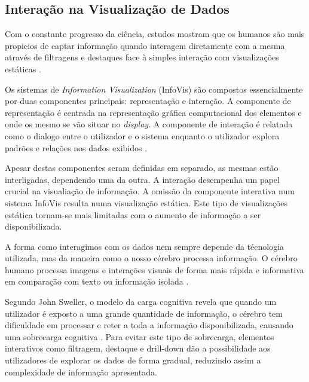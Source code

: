 \subsection{Interação na Visualização de Dados} %
\label{sub:elem_int}

Com o constante progresso da ciência, estudos mostram que os humanos são mais propicios de captar informação quando interagem diretamente com a mesma através de filtragens e destaques face à simples interação com visualizações estáticas \cite{heer2012interactive}. 

Os sistemas de \textit{Information Visualization} (\gls{InfoVis}) são compostos essencialmente por duas componentes principais: representação e interação. A componente de representação é centrada na representação gráfica computacional dos elementos e onde os mesmo se vão situar no \textit{display}. A componente de interação é relatada como o dialogo entre o utilizador e o sistema enquanto o utilizador explora padrões e relações nos dados exibidos \cite{yi2007toward}. 

Apesar destas componentes seram definidas em separado, as mesmas estão interligadas, dependendo uma da outra. A interação desempenha um papel crucial na visualiação de informação. A omissão da componente interativa num sistema \gls{InfoVis} resulta numa visualização estática. Este tipo de visualizações estática tornam-se mais limitadas com o aumento de informação a ser disponibilizada.

A forma como interagimos com os dados nem sempre depende da técnologia utilizada, mas da maneira como o nosso cérebro processa informação. O cérebro humano processa imagens e interações visuais de forma mais rápida e informativa em comparação com texto ou informação isolada \cite{ware2019information}.

Segundo John Sweller, o modelo da carga cognitiva revela que quando um utilizador é exposto a uma grande quantidade de informação, o cérebro tem dificuldade em processar e reter a toda a informação disponibilizada, causando uma sobrecarga cognitiva \cite{sweller1988cognitive}. Para evitar este tipo de sobrecarga, elementos interativos como filtragem, destaque e drill-down dão a possibilidade aos utilizadores de explorar os dados de forma gradual, reduzindo assim a complexidade de informação apresentada.

